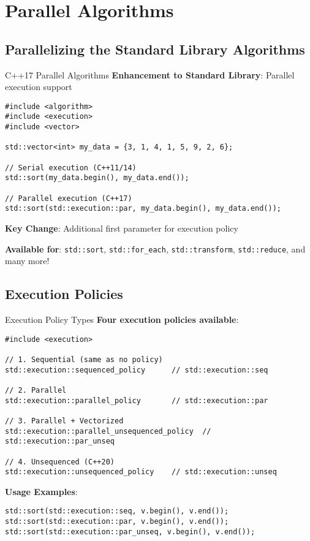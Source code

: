 \section{Parallel Algorithms}

\subsection{Parallelizing the Standard Library Algorithms}
\begin{frame}[fragile]{C++17 Parallel Algorithms}
	\textbf{Enhancement to Standard Library}: Parallel execution support

	\begin{verbatim}
#include <algorithm>
#include <execution>
#include <vector>

std::vector<int> my_data = {3, 1, 4, 1, 5, 9, 2, 6};

// Serial execution (C++11/14)
std::sort(my_data.begin(), my_data.end());

// Parallel execution (C++17)
std::sort(std::execution::par, my_data.begin(), my_data.end());
	\end{verbatim}

	\textbf{Key Change}: Additional first parameter for execution policy

	\vspace{0.5em}
	\textbf{Available for}: \texttt{std::sort}, \texttt{std::for\_each}, \texttt{std::transform}, \texttt{std::reduce}, and many more!
\end{frame}

\subsection{Execution Policies}
\begin{frame}[fragile]{Execution Policy Types}
	\textbf{Four execution policies available}:

	\begin{verbatim}
#include <execution>

// 1. Sequential (same as no policy)
std::execution::sequenced_policy      // std::execution::seq

// 2. Parallel
std::execution::parallel_policy       // std::execution::par

// 3. Parallel + Vectorized
std::execution::parallel_unsequenced_policy  // std::execution::par_unseq

// 4. Unsequenced (C++20)
std::execution::unsequenced_policy    // std::execution::unseq
	\end{verbatim}

	\vspace{1em}
	\textbf{Usage Examples}:
	\begin{verbatim}
std::sort(std::execution::seq, v.begin(), v.end());
std::sort(std::execution::par, v.begin(), v.end());
std::sort(std::execution::par_unseq, v.begin(), v.end());
	\end{verbatim}
\end{frame}

